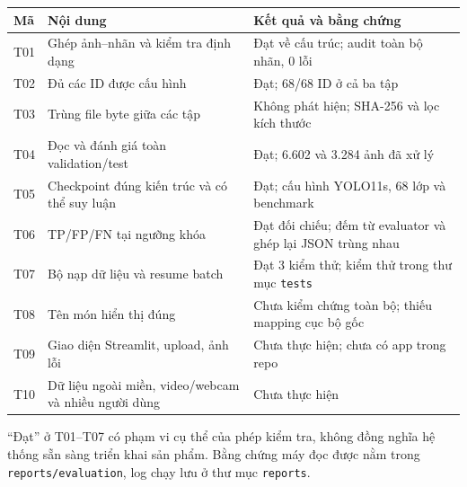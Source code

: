 \documentclass[
  vietnamese,
  12pt,
  a4paper,
]{article}
\newcounter{none} %
\begin{document}
{\def\LTcaptype{none} %
\begin{longtable}[]{@{}
  >{\raggedright\arraybackslash}p{}
  >{\raggedright\arraybackslash}p{}
  >{\raggedright\arraybackslash}p{}@{}}
\toprule\noalign{}
\begin{minipage}[b]{\linewidth}\raggedright
Mã
\end{minipage} & \begin{minipage}[b]{\linewidth}\raggedright
Nội dung
\end{minipage} & \begin{minipage}[b]{\linewidth}\raggedright
Kết quả và bằng chứng
\end{minipage} \\
\midrule\noalign{}
\endhead
\bottomrule\noalign{}
\endlastfoot
T01 & Ghép ảnh--nhãn và kiểm tra định dạng & Đạt về cấu trúc; audit toàn
bộ nhãn, 0 lỗi \\
T02 & Đủ các ID được cấu hình & Đạt; 68/68 ID ở cả ba tập \\
T03 & Trùng file byte giữa các tập & Không phát hiện; SHA-256 và lọc
kích thước \\
T04 & Đọc và đánh giá toàn validation/test & Đạt; 6.602 và 3.284 ảnh đã
xử lý \\
T05 & Checkpoint đúng kiến trúc và có thể suy luận & Đạt; cấu hình
YOLO11s, 68 lớp và benchmark \\
T06 & TP/FP/FN tại ngưỡng khóa & Đạt đối chiếu; đếm từ evaluator và ghép
lại JSON trùng nhau \\
T07 & Bộ nạp dữ liệu và resume batch & Đạt 3 kiểm thử; kiểm thử trong
thư mục
\texttt{t\allowbreak{}e\allowbreak{}s\allowbreak{}t\allowbreak{}s\allowbreak{}} \\
T08 & Tên món hiển thị đúng & Chưa kiểm chứng toàn bộ; thiếu mapping cục
bộ gốc \\
T09 & Giao diện Streamlit, upload, ảnh lỗi & Chưa thực hiện; chưa có app
trong repo \\
T10 & Dữ liệu ngoài miền, video/webcam và nhiều người dùng & Chưa thực
hiện \\
\end{longtable}
}

\endgroup

``Đạt'' ở T01--T07 có phạm vi cụ thể của phép kiểm tra, không đồng nghĩa
hệ thống sẵn sàng triển khai sản phẩm. Bằng chứng máy đọc được nằm trong
\texttt{r\allowbreak{}e\allowbreak{}p\allowbreak{}o\allowbreak{}r\allowbreak{}t\allowbreak{}s\allowbreak{}/\allowbreak{}e\allowbreak{}v\allowbreak{}a\allowbreak{}l\allowbreak{}u\allowbreak{}a\allowbreak{}t\allowbreak{}i\allowbreak{}o\allowbreak{}n\allowbreak{}},
log chạy lưu ở thư mục
\texttt{r\allowbreak{}e\allowbreak{}p\allowbreak{}o\allowbreak{}r\allowbreak{}t\allowbreak{}s\allowbreak{}}.
\end{document}

